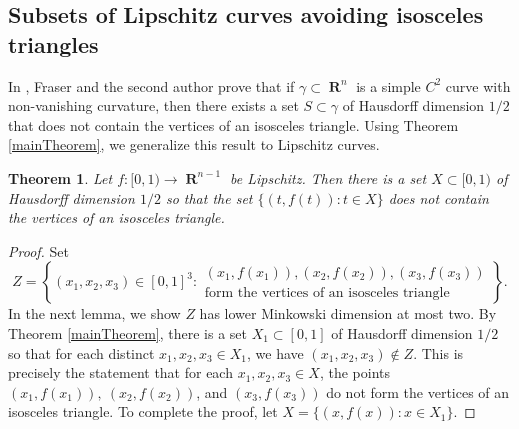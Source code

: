 \documentclass[dvipsnames,letterpaper,12pt]{article}
\numberwithin{equation}{section}
\theoremstyle{plain}
\newtheorem{theorem}{Theorem}
\theoremstyle{remark}
\DeclareMathOperator{\RR}{\mathbf{R}}
\begin{document}
\subsection{Subsets of Lipschitz curves avoiding isosceles triangles}

In \cite{MalabikaRob}, Fraser and the second author prove that if $\gamma\subset\RR^n$ is a simple $C^2$ curve with non-vanishing curvature, then there exists a set $S\subset\gamma$ of Hausdorff dimension $1/2$ that does not contain the vertices of an isosceles triangle. Using Theorem \ref{mainTheorem}, we generalize this result to Lipschitz curves. 

\begin{theorem}\label{C1IsoscelesThm}
	Let $f\colon [0,1) \to \RR^{n-1}$ be Lipschitz. Then there is a set $X \subset [0,1)$ of Hausdorff dimension $1/2$ so that the set $\{(t,f(t)) \colon t\in X\}$ does not contain the vertices of an isosceles triangle.
\end{theorem}
\begin{proof}
	Set
	\[ Z = \left\{ (x_1,x_2,x_3) \in [0,1]^3\colon \begin{array}{c} (x_1,f(x_1)), (x_2,f(x_2)), (x_3,f(x_3))\\
		\textrm{form the vertices of an isosceles triangle} \end{array} \right\}. \]
	In the next lemma, we show $Z$ has lower Minkowski dimension at most two. By Theorem \ref{mainTheorem}, there is a set $X_1\subset[0,1]$ of Hausdorff dimension $1/2$ so that for each distinct $x_1,x_2,x_3\in X_1$, we have $(x_1,x_2,x_3)\not\in Z$. This is precisely the statement that for each $x_1,x_2,x_3\in X$, the points $(x_1,f(x_1)),\ (x_2,f(x_2))$, and $(x_3,f(x_3))$ do not form the vertices of an isosceles triangle. To complete the proof, let $X = \{ (x,f(x)) : x \in X_1 \}$.
\end{proof}
\end{document}
